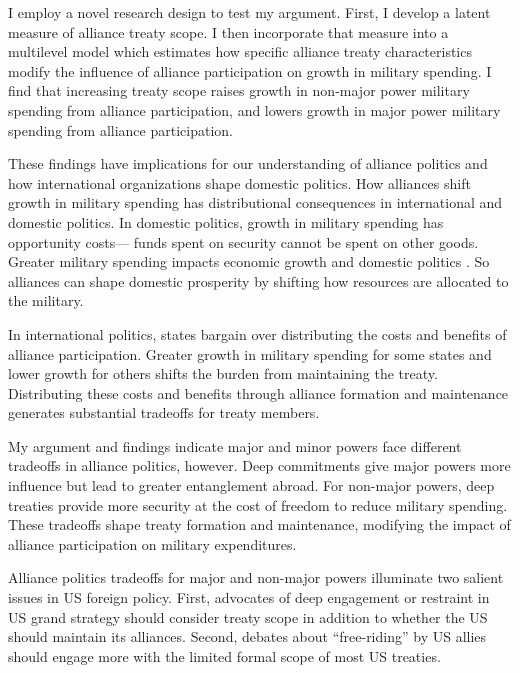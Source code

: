 \documentclass[12pt]{article}
\begin{document}
I employ a novel research design to test my argument.
First, I develop a latent measure of alliance treaty scope. 
I then incorporate that measure into a multilevel model which estimates how specific alliance treaty characteristics modify the influence of alliance participation on growth in military spending.
I find that increasing treaty scope raises growth in non-major power military spending from alliance participation, and lowers growth in major power military spending from alliance participation. 


These findings have implications for our understanding of alliance politics and how international organizations shape domestic politics. 
How alliances shift growth in military spending has distributional consequences in international and domestic politics. 
In domestic politics, growth in military spending has opportunity costs--- funds spent on security cannot be spent on other goods. 
Greater military spending impacts economic growth \citep{ShinWard1999, AlptekinLevine2012} and domestic politics \citep{Narizny2003, WhittenWilliams2011, Williams2015}.
So alliances can shape domestic prosperity by shifting how resources are allocated to the military. 


In international politics, states bargain over distributing the costs and benefits of alliance participation.
Greater growth in military spending for some states and lower growth for others shifts the burden from maintaining the treaty. 
Distributing these costs and benefits through alliance formation and maintenance generates substantial tradeoffs for treaty members. 


My argument and findings indicate major and minor powers face different tradeoffs in alliance politics, however.
Deep commitments give major powers more influence but lead to greater entanglement abroad.
For non-major powers, deep treaties provide more security at the cost of freedom to reduce military spending. 
These tradeoffs shape treaty formation and maintenance, modifying the impact of alliance participation on military expenditures. 


Alliance politics tradeoffs for major and non-major powers illuminate two salient issues in US foreign policy. 
First, advocates of deep engagement \citep{Brooksetal2013} or restraint \citep{Posen2014} in US grand strategy should consider treaty scope in addition to whether the US should maintain its alliances. 
Second, debates about ``free-riding'' by US allies should engage more with the limited formal scope of most US treaties. 
\end{document}
